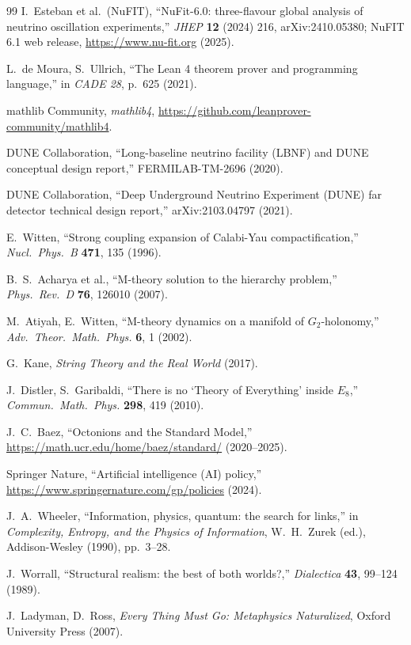 \begin{thebibliography}{99}
 I.~Esteban et al.\ (NuFIT), ``NuFit-6.0: three-flavour global analysis of neutrino oscillation experiments,'' \textit{JHEP} \textbf{12} (2024) 216, arXiv:2410.05380; NuFIT 6.1 web release, \url{https://www.nu-fit.org} (2025).

 L.~de Moura, S.~Ullrich, ``The Lean 4 theorem prover and programming language,'' in \textit{CADE 28}, p.\ 625 (2021).

 mathlib Community, \textit{mathlib4}, \url{https://github.com/leanprover-community/mathlib4}.

 DUNE Collaboration, ``Long-baseline neutrino facility (LBNF) and DUNE conceptual design report,'' FERMILAB-TM-2696 (2020).

 DUNE Collaboration, ``Deep Underground Neutrino Experiment (DUNE) far detector technical design report,'' arXiv:2103.04797 (2021).

 E.~Witten, ``Strong coupling expansion of Calabi-Yau compactification,'' \textit{Nucl.\ Phys.\ B} \textbf{471}, 135 (1996).

 B.~S.~Acharya et al., ``M-theory solution to the hierarchy problem,'' \textit{Phys.\ Rev.\ D} \textbf{76}, 126010 (2007).

 M.~Atiyah, E.~Witten, ``M-theory dynamics on a manifold of $G_2$-holonomy,'' \textit{Adv.\ Theor.\ Math.\ Phys.} \textbf{6}, 1 (2002).

 G.~Kane, \textit{String Theory and the Real World} (2017).

 J.~Distler, S.~Garibaldi, ``There is no `Theory of Everything' inside $E_8$,'' \textit{Commun.\ Math.\ Phys.} \textbf{298}, 419 (2010).

 J.~C.~Baez, ``Octonions and the Standard Model,'' \url{https://math.ucr.edu/home/baez/standard/} (2020--2025).

 Springer Nature, ``Artificial intelligence (AI) policy,'' \url{https://www.springernature.com/gp/policies} (2024).

 J.~A.~Wheeler, ``Information, physics, quantum: the search for links,'' in \textit{Complexity, Entropy, and the Physics of Information}, W.~H.~Zurek (ed.), Addison-Wesley (1990), pp.~3--28.

 J.~Worrall, ``Structural realism: the best of both worlds?,'' \textit{Dialectica} \textbf{43}, 99--124 (1989).

 J.~Ladyman, D.~Ross, \textit{Every Thing Must Go: Metaphysics Naturalized}, Oxford University Press (2007).


\end{thebibliography}
